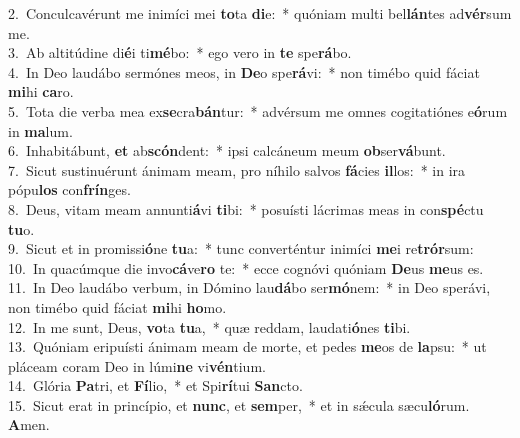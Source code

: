 {2.~}Conculcavérunt me inimíci mei \textbf{to}ta \textbf{di}e:~* quóniam multi bel\textbf{lán}tes ad\textbf{vér}sum me.\\
{3.~}Ab altitúdine di\textbf{é}i ti\textbf{mé}bo:~* ego vero in \textbf{te} spe\textbf{rá}bo.\\
{4.~}In Deo laudábo sermónes meos, in \textbf{De}o spe\textbf{rá}vi:~* non timébo quid fáciat \textbf{mi}hi \textbf{ca}ro.\\
{5.~}Tota die verba mea ex\textbf{se}cra\textbf{bán}tur:~* advérsum me omnes cogitatiónes e\textbf{ó}rum in \textbf{ma}lum.\\
{6.~}Inhabitábunt, \textbf{et} ab\textbf{scón}dent:~* ipsi calcáneum meum \textbf{ob}ser\textbf{vá}bunt.\\
{7.~}Sicut sustinuérunt ánimam meam, pro níhilo salvos \textbf{fá}cies \textbf{il}los:~* in ira pópu\textbf{los} con\textbf{frín}ges.\\
{8.~}Deus, vitam meam annunti\textbf{á}vi \textbf{ti}bi:~* posuísti lácrimas meas in con\textbf{spé}ctu \textbf{tu}o.\\
{9.~}Sicut et in promissi\textbf{ó}ne \textbf{tu}a:~* tunc converténtur inimíci \textbf{me}i re\textbf{trór}sum:\\
{10.~}In quacúmque die invo\textbf{cá}ve\textbf{ro} te:~* ecce cognóvi quóniam \textbf{De}us \textbf{me}us es.\\
{11.~}In Deo laudábo verbum, in Dómino lau\textbf{dá}bo ser\textbf{mó}nem:~* in Deo sperávi, non timébo quid fáciat \textbf{mi}hi \textbf{ho}mo.\\
{12.~}In me sunt, Deus, \textbf{vo}ta \textbf{tu}a,~* quæ reddam, laudati\textbf{ó}nes \textbf{ti}bi.\\
{13.~}Quóniam eripuísti ánimam meam de morte, et pedes \textbf{me}os de \textbf{la}psu:~* ut pláceam coram Deo in lúmi\textbf{ne} vi\textbf{vén}tium.\\
{14.~}Glória \textbf{Pa}tri, et \textbf{Fí}lio,~* et Spi\textbf{rí}tui \textbf{San}cto.\\
{15.~}Sicut erat in princípio, et \textbf{nunc}, et \textbf{sem}per,~* et in sǽcula sæcu\textbf{ló}rum. \textbf{A}men.\\
